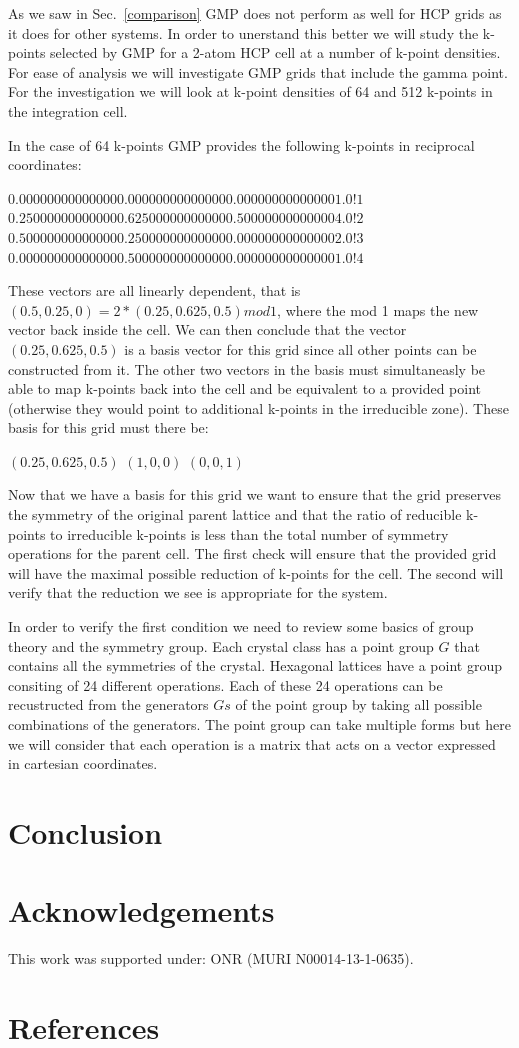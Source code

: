 \documentclass[12pt,prb,reprint]{revtex4-1}
\begin{document}
As we saw in Sec.~\ref{comparison} GMP does not perform as well for
HCP grids as it does for other systems. In order to unerstand this
better we will study the k-points selected by GMP for a 2-atom HCP
cell at a number of k-point densities. For ease of analysis we will
investigate GMP grids that include the gamma point. For the
investigation we will look at k-point densities of 64 and 512 k-points
in the integration cell.

In the case of 64 k-points GMP provides the following k-points in
reciprocal coordinates:

$0.00000000000000 0.00000000000000 0.00000000000000 1.0 ! 1$
$0.25000000000000 0.62500000000000 0.50000000000000 4.0 ! 2$
$0.50000000000000 0.25000000000000 0.00000000000000 2.0 ! 3$
$0.00000000000000 0.50000000000000 0.00000000000000 1.0 ! 4$

These vectors are all linearly dependent, that is
$(0.5,0.25,0)=2*(0.25,0.625,0.5) mod 1$, where the mod 1 maps the new
vector back inside the cell. We can then conclude that the vector
$(0.25,0.625,0.5)$ is a basis vector for this grid since all other
points can be constructed from it. The other two vectors in the basis
must simultaneasly be able to map k-points back into the cell and be
equivalent to a provided point (otherwise they would point to
additional k-points in the irreducible zone). These basis for this
grid must there be:

$(0.25,0.625,0.5)$
$(1,0,0)$
$(0,0,1)$

Now that we have a basis for this grid we want to ensure that the grid
preserves the symmetry of the original parent lattice and that the
ratio of reducible k-points to irreducible k-points is less than the
total number of symmetry operations for the parent cell. The first
check will ensure that the provided grid will have the maximal
possible reduction of k-points for the cell. The second will verify
that the reduction we see is appropriate for the system.

In order to verify the first condition we need to review some basics
of group theory and the symmetry group. Each crystal class has a point
group $G$ that contains all the symmetries of the crystal. Hexagonal
lattices have a point group consiting of 24 different operations. Each
of these 24 operations can be recustructed from the generators $Gs$ of
the point group by taking all possible combinations of the
generators. The point group can take multiple forms but here we will
consider that each operation is a matrix that acts on a vector
expressed in cartesian coordinates.

\section{Conclusion} \label{conclusion}

\section{Acknowledgements}
This work was supported under: ONR (MURI N00014-13-1-0635).

\section{References}



\end{document}
